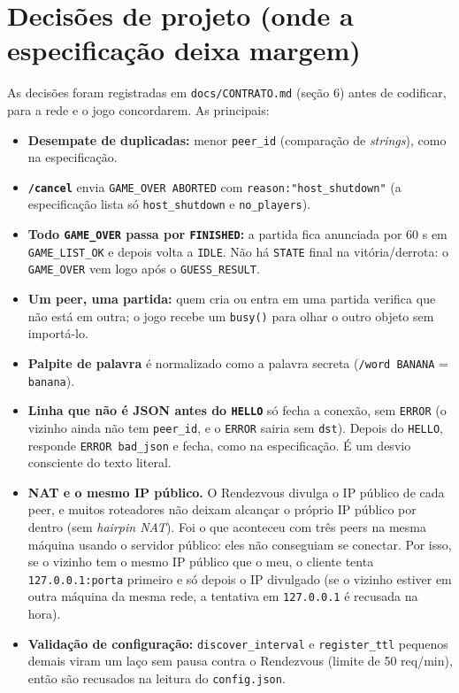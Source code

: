 \documentclass[11pt,a4paper]{article}
\begin{document}
\section{Decisões de projeto (onde a especificação deixa margem)}\label{sec:decisoes}
As decisões foram registradas em \texttt{docs/CONTRATO.md} (seção 6) antes de codificar, para a rede e o jogo concordarem. As principais:
\begin{itemize}
\item \textbf{Desempate de duplicadas:} menor \texttt{peer\_id} (comparação de \emph{strings}), como na especificação.
\item \textbf{\texttt{/cancel}} envia \texttt{GAME\_OVER ABORTED} com \texttt{reason:"host\_shutdown"} (a especificação lista só \texttt{host\_shutdown} e \texttt{no\_players}).
\item \textbf{Todo \texttt{GAME\_OVER} passa por \texttt{FINISHED}:} a partida fica anunciada por 60 s em \texttt{GAME\_LIST\_OK} e depois volta a \texttt{IDLE}. Não há \texttt{STATE} final na vitória/derrota: o \texttt{GAME\_OVER} vem logo após o \texttt{GUESS\_RESULT}.
\item \textbf{Um peer, uma partida:} quem cria ou entra em uma partida verifica que não está em outra; o jogo recebe um \texttt{busy()} para olhar o outro objeto sem importá-lo.
\item \textbf{Palpite de palavra} é normalizado como a palavra secreta (\texttt{/word BANANA} = \texttt{banana}).
\item \textbf{Linha que não é JSON antes do \texttt{HELLO}} só fecha a conexão, sem \texttt{ERROR} (o vizinho ainda não tem \texttt{peer\_id}, e o \texttt{ERROR} sairia sem \texttt{dst}). Depois do \texttt{HELLO}, responde \texttt{ERROR bad\_json} e fecha, como na especificação. É um desvio consciente do texto literal.
\item \textbf{NAT e o mesmo IP público.} O Rendezvous divulga o IP público de cada peer, e muitos roteadores não deixam alcançar o próprio IP público por dentro (sem \emph{hairpin NAT}). Foi o que aconteceu com três peers na mesma máquina usando o servidor público: eles não conseguiam se conectar. Por isso, se o vizinho tem o mesmo IP público que o meu, o cliente tenta \texttt{127.0.0.1:porta} primeiro e só depois o IP divulgado (se o vizinho estiver em outra máquina da mesma rede, a tentativa em \texttt{127.0.0.1} é recusada na hora).
\item \textbf{Validação de configuração:} \texttt{discover\_interval} e \texttt{register\_ttl} pequenos demais viram um laço sem pausa contra o Rendezvous (limite de 50 req/min), então são recusados na leitura do \texttt{config.json}.
\end{itemize}
\end{document}
